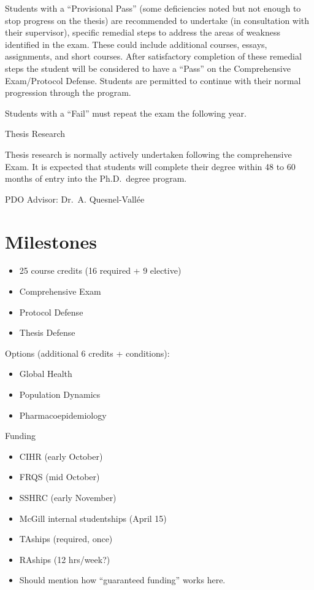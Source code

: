 \documentclass[
]{book}
\providecommand{\tightlist}{%
  \setlength{\itemsep}{0pt}\setlength{\parskip}{0pt}}
\begin{document}
Students with a ``Provisional Pass'' (some deficiencies noted but not enough to stop progress on the thesis) are recommended to undertake (in consultation with their supervisor), specific remedial steps to address the areas of weakness identified in the exam. These could include additional courses, essays, assignments, and short courses. After satisfactory completion of these remedial steps the student will be considered to have a ``Pass'' on the Comprehensive Exam/Protocol Defense. Students are permitted to continue with their normal progression through the program.

Students with a ``Fail'' must repeat the exam the following year.

Thesis Research

Thesis research is normally actively undertaken following the comprehensive Exam. It is expected that students will complete their degree within 48 to 60 months of entry into the Ph.D.~degree program.

PDO Advisor:
Dr.~A. Quesnel-Vallée

\hypertarget{milestones}{%
\chapter{Milestones}\label{milestones}}

\begin{itemize}
\tightlist
\item
  25 course credits (16 required + 9 elective)
\item
  Comprehensive Exam
\item
  Protocol Defense
\item
  Thesis Defense
\end{itemize}

Options (additional 6 credits + conditions):

\begin{itemize}
\tightlist
\item
  Global Health
\item
  Population Dynamics
\item
  Pharmacoepidemiology
\end{itemize}

Funding

\begin{itemize}
\tightlist
\item
  CIHR (early October)
\item
  FRQS (mid October)
\item
  SSHRC (early November)
\item
  McGill internal studentships (April 15)
\item
  TAships (required, once)
\item
  RAships (12 hrs/week?)
\item
  Should mention how ``guaranteed funding'' works here.
\end{itemize}
\end{document}
